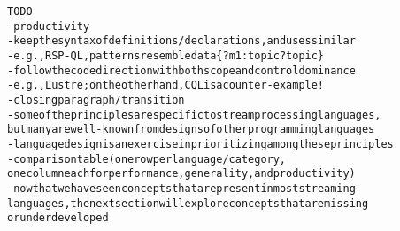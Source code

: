 \begin{alltt}TODO\scriptsize
- productivity
  - keep the syntax of definitions/declarations, and uses similar
    - e.g., RSP-QL, patterns resemble data \{ ?m1 :topic ?topic \}
  - follow the code direction with both scope and control dominance
    - e.g., Lustre; on the other hand, CQL is a counter-example!
- closing paragraph / transition
  - some of the principles are specific to stream processing languages,
    but many are well-known from designs of other programming languages
  - language design is an exercise in prioritizing among these principles
  - comparison table (one row per language/category,
    one column each for performance, generality, and productivity)
  - now that we have seen concepts that are present in most streaming
    languages, the next section will explore concepts that are missing
    or underdeveloped
\end{alltt}
